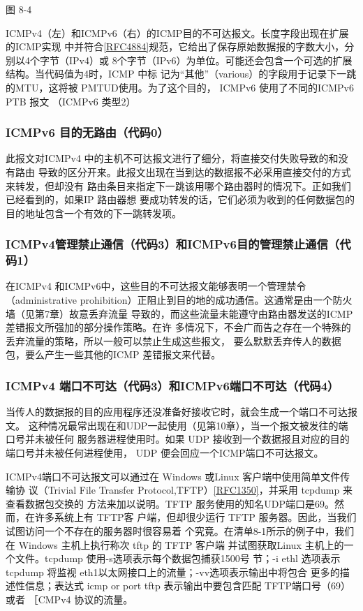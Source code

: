 图 8-4

ICMPv4（左）和ICMPv6（右）的ICMP目的不可达报文。长度字段出现在扩展的ICMP实现
中并符合\href{https://www.rfc-editor.org/rfc/rfc4884}{[RFC4884]}规范，它给出了保存原始数据报的字数大小，分别以4个字节（IPv4）或
8个字节（IPv6）为单位。可能还会包含一个可选的扩展结构。当代码值为4时，ICMP 中标
记为“其他”（various）的字段用于记录下一跳的MTU，这将被 PMTUD使用。为了这个目的，
ICMPv6 使用了不同的ICMPv6 PTB 报文 （ICMPv6 类型2）

\subsubsection{ICMPv6 目的无路由（代码0）}
此报文对ICMPv4 中的主机不可达报文进行了细分，将直接交付失败导致的和没有路由
导致的区分开来。此报文出现在当到达的数据报不必采用直接交付的方式来转发，但却没有
路由条目来指定下一跳该用哪个路由器时的情况下。正如我们已经看到的，如果IP 路由器想
要成功转发的话，它们必须为收到的任何数据包的目的地址包含一个有效的下一跳转发项。

\subsubsection{ICMPv4管理禁止通信（代码3）和ICMPv6目的管理禁止通信（代码1）}
在ICMPv4 和ICMPv6中，这些目的不可达报文能够表明一个管理禁令（administrative
prohibition）正阻止到目的地的成功通信。这通常是由一个防火墙（见第7章）故意丢弃流量
导致的，而这些流量未能遵守由路由器发送的ICMP差错报文所强加的部分操作策略。在许
多情况下，不会广而告之存在一个特殊的丢弃流量的策略，所以一般可以禁止生成这些报文，
要么默默丢弃传人的数据包，要么产生一些其他的ICMP 差错报文来代替。

\subsubsection{ICMPv4 端口不可达（代码3）和ICMPv6端口不可达（代码4）}
当传人的数据报的目的应用程序还没准备好接收它时，就会生成一个端口不可达报文。
这种情况最常出现在和UDP一起使用（见第10章），当一个报文被发往的端口号并未被任何
服务器进程使用时。如果 UDP 接收到一个数据报且对应的目的端口号并未被任何进程使用，
UDP 便会回应一个ICMP端口不可达报文。

ICMPv4端口不可达报文可以通过在 Windows 或Linux 客户端中使用简单文件传输协
议（Trivial File Transfer Protocol,TFTP）\href{https://www.rfc-editor.org/rfc/rfc1350}{[RFC1350]}，并采用 tcpdump 来查看数据包交换的
方法来加以说明。TFTP 服务使用的知名UDP端口是69。然而，在许多系统上有 TFTP客
户端，但却很少运行 TFTP 服务器。因此，当我们试图访问一个不存在的服务器时很容易着
个究竟。在清单8-1所示的例子中，我们在 Windows 主机上执行称次 tftp 的 TFTP 客户端
并试图获取Linux 主机上的一个文件。tcpdump 使用-s选项表示每个数据包捕获1500号
节；-i ethl 选项表示 tcpdump 将监视 eth1以太网接口上的流量；-vv选项表示输出中将包合
更多的描述性信息；表达式 icmp or port tftp 表示输出中要包含匹配 TFTP端口号（69）或者
［CMPv4 协议的流量。

